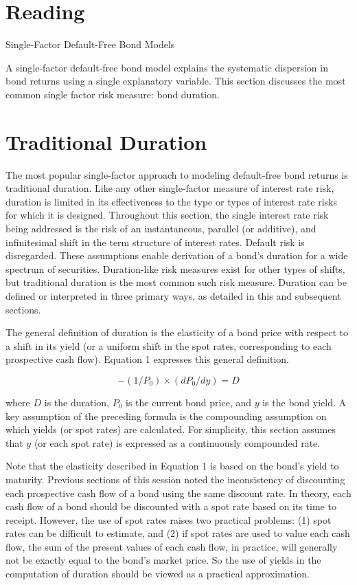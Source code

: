 \documentclass[11pt]{article}
\begin{document}
\section*{Reading}
Single-Factor Default-Free Bond Models

A single-factor default-free bond model explains the systematic dispersion in bond returns using a single explanatory variable. This section discusses the most common single factor risk measure: bond duration.

\section*{Traditional Duration}
The most popular single-factor approach to modeling default-free bond returns is traditional duration. Like any other single-factor measure of interest rate risk, duration is limited in its effectiveness to the type or types of interest rate risks for which it is designed. Throughout this section, the single interest rate risk being addressed is the risk of an instantaneous, parallel (or additive), and infinitesimal shift in the term structure of interest rates. Default risk is disregarded. These assumptions enable derivation of a bond's duration for a wide spectrum of securities. Duration-like risk measures exist for other types of shifts, but traditional duration is the most common such risk measure. Duration can be defined or interpreted in three primary ways, as detailed in this and subsequent sections.

The general definition of duration is the elasticity of a bond price with respect to a shift in its yield (or a uniform shift in the spot rates, corresponding to each prospective cash flow). Equation 1 expresses this general definition.


\begin{equation*}
-\left(1 / P_{0}\right) \times\left(d P_{0} / d y\right)=D \tag{1}
\end{equation*}


where $D$ is the duration, $P_{0}$ is the current bond price, and $y$ is the bond yield. A key assumption of the preceding formula is the compounding assumption on which yields (or spot rates) are calculated. For simplicity, this section assumes that $y$ (or each spot rate) is expressed as a continuously compounded rate.

Note that the elasticity described in Equation 1 is based on the bond's yield to maturity. Previous sections of this session noted the inconsistency of discounting each prospective cash flow of a bond using the same discount rate. In theory, each cash flow of a bond should be discounted with a spot rate based on its time to receipt. However, the use of spot rates raises two practical problems: (1) spot rates can be difficult to estimate, and (2) if spot rates are used to value each cash flow, the sum of the present values of each cash flow, in practice, will generally not be exactly equal to the bond's market price. So the use of yields in the computation of duration should be viewed as a practical approximation.
\end{document}
